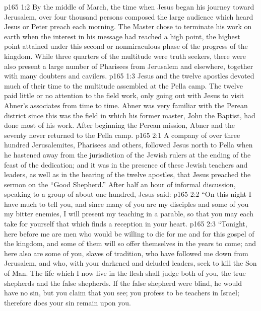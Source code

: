 \vs p165 1:2 By the middle of March, the time when Jesus began his journey toward Jerusalem, over four thousand persons composed the large audience which heard Jesus or Peter preach each morning. The Master chose to terminate his work on earth when the interest in his message had reached a high point, the highest point attained under this second or nonmiraculous phase of the progress of the kingdom. While three quarters of the multitude were truth seekers, there were also present a large number of Pharisees from Jerusalem and elsewhere, together with many doubters and cavilers.
\vs p165 1:3 Jesus and the twelve apostles devoted much of their time to the multitude assembled at the Pella camp. The twelve paid little or no attention to the field work, only going out with Jesus to visit Abner’s associates from time to time. Abner was very familiar with the Perean district since this was the field in which his former master, John the Baptist, had done most of his work. After beginning the Perean mission, Abner and the seventy never returned to the Pella camp.
\vs p165 2:1 A company of over three hundred Jerusalemites, Pharisees and others, followed Jesus north to Pella when he hastened away from the jurisdiction of the Jewish rulers at the ending of the feast of the dedication; and it was in the presence of these Jewish teachers and leaders, as well as in the hearing of the twelve apostles, that Jesus preached the sermon on the “Good Shepherd.” After half an hour of informal discussion, speaking to a group of about one hundred, Jesus said:
\vs p165 2:2 \pc \textcolor{ubdarkred}{“On this night I have much to tell you, and since many of you are my disciples and some of you my bitter enemies, I will present my teaching in a parable, so that you may each take for yourself that which finds a reception in your heart.}
\vs p165 2:3 \textcolor{ubdarkred}{“Tonight, here before me are men who would be willing to die for me and for this gospel of the kingdom, and some of them will so offer themselves in the years to come; and here also are some of you, slaves of tradition, who have followed me down from Jerusalem, and who, with your darkened and deluded leaders, seek to kill the Son of Man. The life which I now live in the flesh shall judge both of you, the true shepherds and the false shepherds. If the false shepherd were blind, he would have no sin, but you claim that you see; you profess to be teachers in Israel; therefore does your sin remain upon you.}
